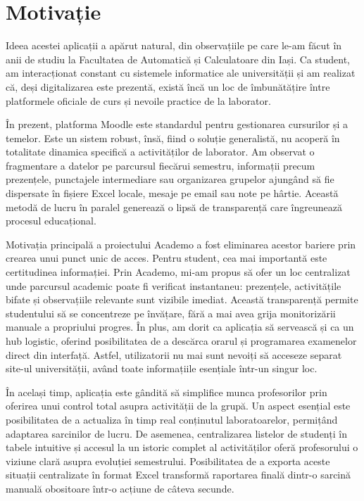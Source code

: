\chapter*{Motivație}

Ideea acestei aplicații a apărut natural, din observațiile pe care le-am făcut
în anii de studiu la Facultatea de Automatică și Calculatoare din Iași. Ca student,
am interacționat constant cu sistemele informatice ale universității și am realizat că,
deși digitalizarea este prezentă, există încă un loc de îmbunătățire între platformele
oficiale de curs și nevoile practice de la laborator.

În prezent, platforma Moodle este standardul pentru gestionarea cursurilor și a temelor.
Este un sistem robust, însă, fiind o soluție generalistă, nu acoperă în totalitate dinamica specifică
a activităților de laborator. Am observat o fragmentare a datelor pe parcursul fiecărui semestru,
informații precum prezențele, punctajele intermediare sau organizarea grupelor ajungând să fie dispersate
în fișiere Excel locale, mesaje pe email sau note pe hârtie. Această metodă de lucru în paralel 
generează o lipsă de transparență care îngreunează procesul educațional.

Motivația principală a proiectului Academo a fost eliminarea acestor bariere prin crearea
unui punct unic de acces. Pentru student, cea mai importantă este certitudinea informației.
Prin Academo, mi-am propus să ofer un loc centralizat unde parcursul academic poate
fi verificat instantaneu: prezențele, activitățile bifate și observațiile relevante
sunt vizibile imediat. Această transparență permite studentului să se concentreze pe
învățare, fără a mai avea grija monitorizării manuale a propriului progres. În plus,
am dorit ca aplicația să servească și ca un hub logistic, oferind posibilitatea de a
descărca orarul și programarea examenelor direct din interfață. Astfel, utilizatorii nu mai 
sunt nevoiți să acceseze separat site-ul universității, având toate informațiile esențiale 
într-un singur loc.

În același timp, aplicația este gândită să simplifice munca profesorilor prin oferirea unui 
control total asupra activității de la grupă. Un aspect esențial este posibilitatea de a 
actualiza în timp real conținutul laboratoarelor, permițând adaptarea sarcinilor de lucru. 
De asemenea, centralizarea listelor de studenți în tabele intuitive și accesul la 
un istoric complet al activităților oferă profesorului o viziune clară asupra evoluției semestrului. 
Posibilitatea de a exporta aceste situații centralizate în format Excel transformă raportarea finală 
dintr-o sarcină manuală obositoare într-o acțiune de câteva secunde.

